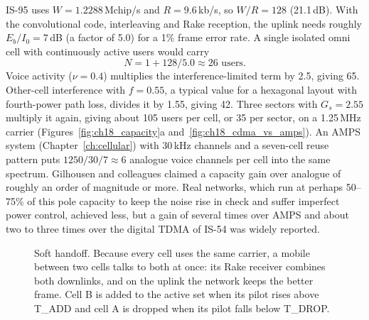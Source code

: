 \begin{worked}
IS-95 uses $W=1.2288$\,Mchip/s and $R=9.6$\,kb/s, so $W/R=128$ (21.1\,dB). With the
convolutional code, interleaving and Rake reception, the uplink needs roughly
$E_b/I_0=7$\,dB (a factor of 5.0) for a 1\% frame error rate. A single isolated omni cell
with continuously active users would carry
\[
N=1+128/5.0\approx26\text{ users}.
\]
Voice activity ($\nu=0.4$) multiplies the interference-limited term by 2.5, giving 65.
Other-cell interference with $f=0.55$, a typical value for a hexagonal layout with
fourth-power path loss, divides it by 1.55, giving 42. Three sectors with $G_s=2.55$ multiply
it again, giving about 105 users per cell, or 35 per sector, on a 1.25\,MHz carrier
(Figures~\ref{fig:ch18_capacity}a and~\ref{fig:ch18_cdma_vs_amps}). An AMPS system
(Chapter~\ref{ch:cellular}) with 30\,kHz channels and a seven-cell reuse pattern puts
$1250/30/7\approx6$ analogue voice channels per cell into the same spectrum. Gilhousen and
colleagues claimed a capacity gain over analogue of roughly an order of magnitude or more. Real
networks, which run at perhaps 50--75\% of this pole capacity to keep the noise rise in check and
suffer imperfect power control, achieved less, but a gain of several times over AMPS and about two
to three times over the digital TDMA of IS-54 was widely reported.
\end{worked}

\begin{figure}[htbp]\centering
{}
\caption{Soft handoff. Because every cell uses the same carrier, a mobile between two cells talks
to both at once: its Rake receiver combines both downlinks, and on the uplink the network keeps
the better frame. Cell B is added to the active set when its pilot rises above T\_ADD and cell A is
dropped when its pilot falls below T\_DROP.}
\label{fig:ch18_soft_handoff}
\end{figure}

